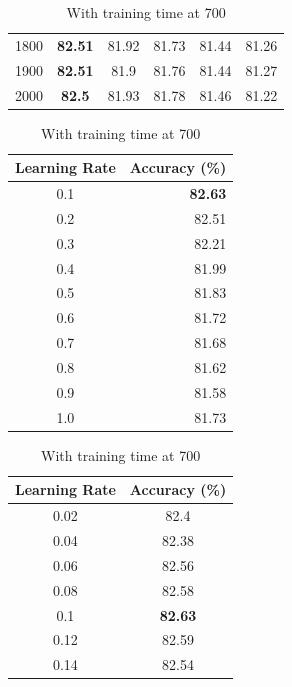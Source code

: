 \documentclass[12pt]{article}
\begin{document}
\begin{table}[H]
\begin{subtable}{.49\linewidth}
\begin{tabular}{c|ccccc}
            1800  & \textbf{82.51} & 81.92 & 81.73 & 81.44 & 81.26 \\
            1900  & \textbf{82.51} & 81.9  & 81.76 & 81.44 & 81.27 \\
            2000  & \textbf{82.5} & 81.93 & 81.78 & 81.46 & 81.22 \\
            \bottomrule
          \end{tabular}
          \label{tab:ann-lr-a}
        \end{subtable}
        \begin{subtable}{.49\linewidth}
          \centering
          \caption{With training time at 700}
          \begin{tabular}{c|r}
            \toprule
            \multicolumn{1}{l|}{Learning Rate} & \multicolumn{1}{l}{Accuracy (\%)} \\
            \midrule
            0.1   & \textbf{82.63} \\
            0.2   & 82.51 \\
            0.3   & 82.21 \\
            0.4   & 81.99 \\
            0.5   & 81.83 \\
            0.6   & 81.72 \\
            0.7   & 81.68 \\
            0.8   & 81.62 \\
            0.9   & 81.58 \\
            1.0   & 81.73 \\
            \bottomrule
          \end{tabular}
          \label{tab:ann-lr-b}
        \end{subtable}
        \begin{subtable}{.49\linewidth}
          \centering
          \caption{With training time at 700}
          \begin{tabular}{c|c}
            \toprule
            \multicolumn{1}{l|}{Learning Rate} & \multicolumn{1}{l}{Accuracy (\%)} \\
            \midrule
            0.02  & 82.4 \\
            0.04  & 82.38 \\
            0.06  & 82.56 \\
            0.08  & 82.58 \\
            0.1   & \textbf{82.63} \\
            0.12  & 82.59 \\
            0.14  & 82.54 \\

\end{tabular}
\end{subtable}
\end{table}
\end{document}
